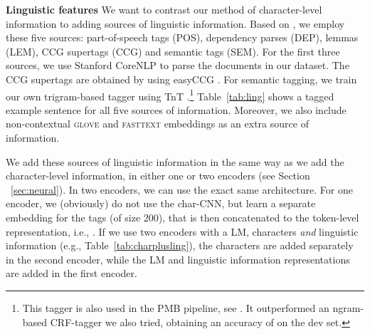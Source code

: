 \documentclass[11pt,a4paper]{article}
\newcommand{\glove}{\textsc{glove}}
\newcommand{\fasttext}{\textsc{fasttext}}
\newcommand{\inlineheader}[1]{\vspace{0.06cm}
\noindent\textbf{#1}\quad
}
\begin{document}
\inlineheader{Linguistic features} We want to contrast our method of character-level information to adding sources of linguistic information. Based on \citet{van-noord-etal-2019-linguistic}, we employ these five sources: part-of-speech tags (POS), dependency parses (DEP), lemmas (LEM), CCG supertags (CCG) and semantic tags (SEM). For the first three sources, we use Stanford CoreNLP \citep{manning2014stanford} to parse the documents in our dataset. The CCG supertags are obtained by using easyCCG \citep{lewisSteedman:14}. For semantic tagging, we train our own trigram-based tagger using TnT \citep{Brants:2000}.\footnote{This tagger is also used in the PMB pipeline, see \citet{semantic-tagset:17}. It outperformed an ngram-based CRF-tagger \citep{crf:01} we also tried, obtaining an accuracy of  on the dev set.} Table~\ref{tab:ling} shows a tagged example sentence for all five sources of information. Moreover, we also include non-contextual \glove{} and \fasttext{} embeddings as an extra source of information.

We add these sources of linguistic information in the same way as we add the character-level information, in either one or two encoders (see Section ~\ref{sec:neural}). In two encoders, we can use the exact same architecture. For one encoder, we (obviously) do not use the char-CNN, but learn a separate embedding for the tags (of size 200), that is then concatenated to the token-level representation, i.e., . If we use two encoders with a LM, characters \emph{and} linguistic information (e.g., Table~\ref{tab:charplusling}), the characters are added separately in the second encoder, while the LM and linguistic information representations are added in the first encoder.
\end{document}
